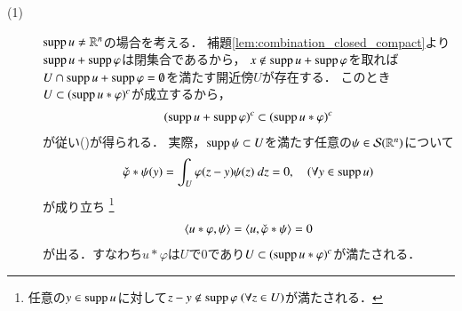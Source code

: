 	\begin{prf}\mbox{}
		\begin{description}
			\item[(1)]
				$\operatorname{supp} u \neq \mathbb{R}^n$の場合を考える．
				補題\ref{lem:combination_closed_compact}より$\operatorname{supp} u + \operatorname{supp} \varphi$は閉集合であるから，
				$x \notin \operatorname{supp} u+\operatorname{supp} \varphi$を取れば
				$U \cap \operatorname{supp} u+\operatorname{supp} \varphi = \emptyset$を満たす開近傍$U$が存在する．
				このとき$U \subset (\operatorname{supp} u \ast \varphi)^c$が成立するから，
				\begin{align}
					(\operatorname{supp} u + \operatorname{supp} \varphi)^c \subset (\operatorname{supp} u \ast \varphi)^c
				\end{align}
				が従い()が得られる．
				実際，$\operatorname{supp} \psi \subset U$を満たす任意の$\psi \in \mathcal{S}(\mathbb{R}^n)$について
				\begin{align}
					\check{\varphi} \ast \psi (y)
					= \int_{U} \varphi(z - y)\psi(z)\ dz
					= 0,
					\quad (\forall y \in \operatorname{supp} u)
				\end{align}
				が成り立ち
				\footnote{
					任意の$y \in \operatorname{supp} u$に対して$z - y \notin \operatorname{supp} \varphi\ (\forall z \in U)$が満たされる．
				}
				\begin{align}
					\inprod<u \ast \varphi, \psi>
					= \inprod<u, \check{\varphi} \ast \psi>
					= 0
				\end{align}
				が出る．すなわち$u \ast \varphi$は$U$で0であり$U \subset (\operatorname{supp} u \ast \varphi)^c$が満たされる．
				

\end{description}
\end{prf}

